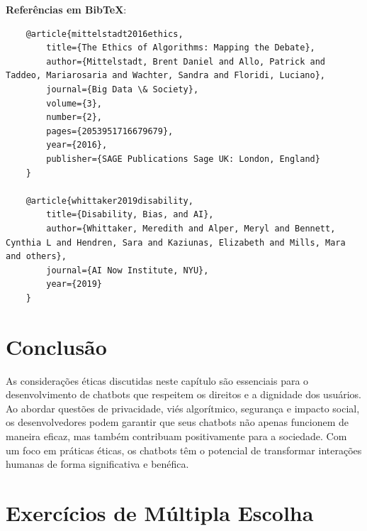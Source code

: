 \documentclass[14pt,a4paper,oneside]{book}
\begin{document}
\textbf{Referências em BibTeX}:

\begin{verbatim}
	@article{mittelstadt2016ethics,
		title={The Ethics of Algorithms: Mapping the Debate},
		author={Mittelstadt, Brent Daniel and Allo, Patrick and Taddeo, Mariarosaria and Wachter, Sandra and Floridi, Luciano},
		journal={Big Data \& Society},
		volume={3},
		number={2},
		pages={2053951716679679},
		year={2016},
		publisher={SAGE Publications Sage UK: London, England}
	}
	
	@article{whittaker2019disability,
		title={Disability, Bias, and AI},
		author={Whittaker, Meredith and Alper, Meryl and Bennett, Cynthia L and Hendren, Sara and Kaziunas, Elizabeth and Mills, Mara and others},
		journal={AI Now Institute, NYU},
		year={2019}
	}
\end{verbatim}

\section{Conclusão}

As considerações éticas discutidas neste capítulo são essenciais para o desenvolvimento de chatbots que respeitem os direitos e a dignidade dos usuários. Ao abordar questões de privacidade, viés algorítmico, segurança e impacto social, os desenvolvedores podem garantir que seus chatbots não apenas funcionem de maneira eficaz, mas também contribuam positivamente para a sociedade. Com um foco em práticas éticas, os chatbots têm o potencial de transformar interações humanas de forma significativa e benéfica.

\section*{Exercícios de Múltipla Escolha}
\end{document}
